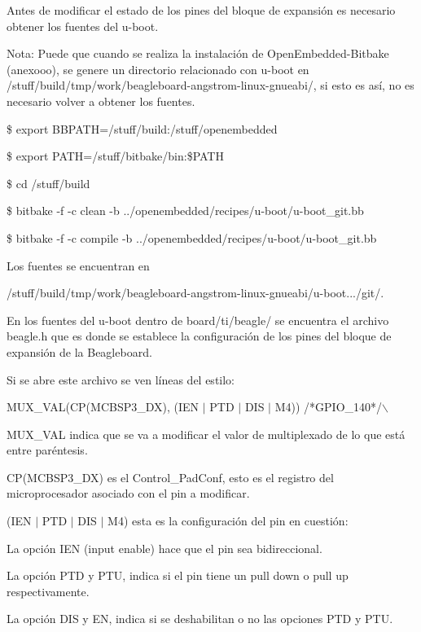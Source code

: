 Antes de modificar el estado de los pines del bloque de expansión es necesario obtener los fuentes del u-boot.

Nota: Puede que cuando se realiza la instalación de OpenEmbedded-Bitbake (anexooo), se genere un directorio relacionado con u-boot en /stuff/build/tmp/work/beagleboard-angstrom-linux-gnueabi/, si esto es así, no es necesario volver a obtener los fuentes.

\bigskip
{}

\centerline{\$ export BBPATH=/stuff/build:/stuff/openembedded}

\centerline{\$ export PATH=/stuff/bitbake/bin:\$PATH}

\bigskip
{}

\centerline{\$ cd /stuff/build}

\centerline{\$ bitbake -f -c clean -b ../openembedded/recipes/u-boot/u-boot\_git.bb}

\centerline{\$ bitbake -f -c compile -b ../openembedded/recipes/u-boot/u-boot\_git.bb}

\bigskip
Los fuentes se encuentran en 

/stuff/build/tmp/work/beagleboard-angstrom-linux-gnueabi/u-boot.../git/.

\bigskip
En los fuentes del u-boot dentro de board/ti/beagle/ se encuentra el archivo beagle.h que es donde se establece la configuración de los pines del bloque de expansión de la Beagleboard.

Si se abre este archivo se ven líneas del estilo: 


MUX\_VAL(CP(MCBSP3\_DX), (IEN $|$ PTD $|$ DIS $|$ M4)) /*GPIO\_140*/$\backslash$ 

\bigskip
MUX\_VAL indica que se va a modificar el valor de multiplexado de lo que está entre paréntesis. 

\bigskip
CP(MCBSP3\_DX) es el Control\_PadConf, esto es el registro del microprocesador asociado con el 
pin a modificar. 

\bigskip
(IEN $|$ PTD $|$ DIS $|$ M4) esta es la configuración del pin en cuestión: 


La opción IEN (input enable) hace que el pin sea bidireccional. 

La opción PTD y PTU, indica si el pin tiene un pull down o pull up respectivamente. 

La opción DIS y EN, indica si se deshabilitan o no las opciones PTD y PTU. 

